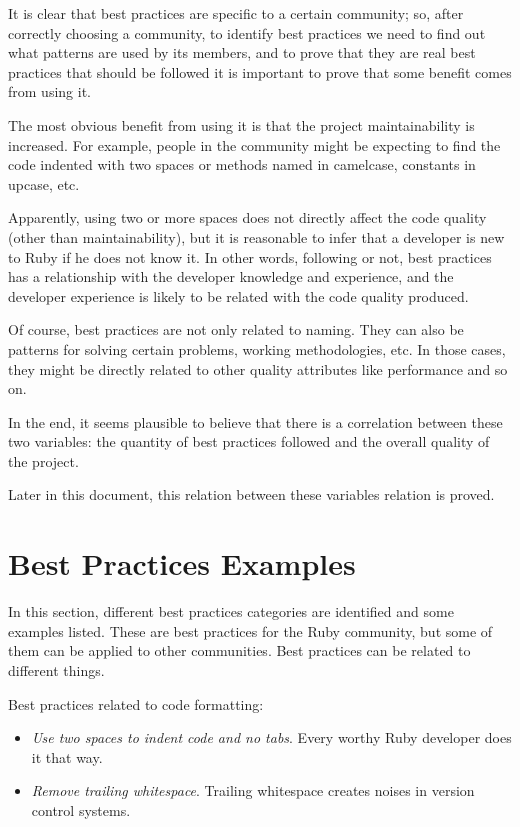 It is clear that best practices are specific to a certain community; 
so, after correctly choosing a community, to identify best practices we need
to find out what patterns are used by its members, 
and to prove that they are real best practices that should be followed 
it is important to prove that some benefit comes from using it.

The most obvious benefit from using it
is that the project maintainability is increased.
For example, people in the community might be expecting to find the code indented with two spaces or 
methods named in camelcase, constants in upcase, etc.

Apparently, using two or more spaces does not directly affect the code quality (other than maintainability), 
but it is reasonable to infer that a developer is new to Ruby if he does not know it.
In other words, following or not, best practices has a relationship with the developer knowledge and experience,
and the developer experience is likely to be related with the code quality produced.

Of course, best practices are not only related to naming.
They can also be patterns for solving certain problems, working methodologies, etc.
In those cases, they might be directly related to other quality attributes like performance and so on.

In the end, it seems plausible to believe that there is a correlation between these two variables:
the quantity of best practices followed and the overall quality of the project. 

Later in this document, this relation between these variables relation is proved.


\section{Best Practices Examples} \label{sec:best_practices_examples}
In this section, different best practices categories are identified and some examples listed.
These are best practices for the Ruby community, but some of them can be applied to other communities.
Best practices can be related to different things.


Best practices related to code formatting:
\begin{itemize}
\item \emph{Use two spaces to indent code and no tabs}. Every worthy Ruby developer does it that way.
\item \emph{Remove trailing whitespace}. Trailing whitespace creates noises in version control systems.
\end{itemize}

